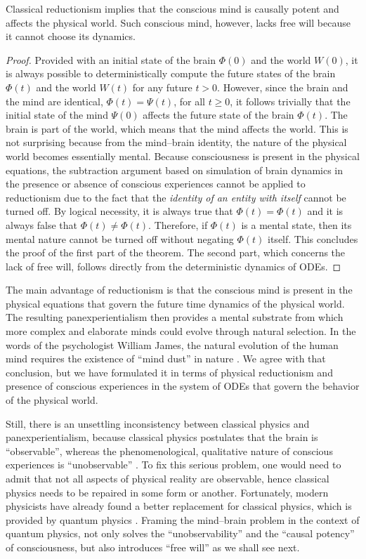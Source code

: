 \documentclass{ws-ijmpb}
\begin{document}
\begin{theorem}
\label{thm:2}
Classical reductionism implies that the conscious mind
is causally potent and affects the physical world. Such conscious
mind, however, lacks free will because it cannot choose its dynamics.
\end{theorem}
\begin{proof}
Provided with an initial state of the brain $\Phi(0)$ and the world $W(0)$, it is always
possible to deterministically compute the future states of the brain
$\Phi(t)$ and the world $W(t)$ for any future $t>0$. However, since the brain and the
mind are identical, $\Phi(t)=\Psi(t)$, for all $t\geq 0$, it follows
trivially that the initial state of the mind $\Psi(0)$ affects the
future state of the brain $\Phi(t)$. The brain is part of the world,
which means that the mind affects the world. This is not surprising
because from the mind--brain identity, the nature of the physical world becomes essentially mental.
Because consciousness is present in the physical equations,
the subtraction argument based on simulation of brain dynamics in the presence or absence of
conscious experiences cannot be applied to reductionism due to the fact that the
\emph{identity of an entity with itself} cannot be turned off.
By logical necessity, it is always true that $\Phi(t)=\Phi(t)$ and it is always
false that $\Phi(t)\neq\Phi(t)$. Therefore, if $\Phi(t)$ is a mental
state, then its mental nature cannot be turned off without negating
$\Phi(t)$ itself. This concludes the proof of the first part of the theorem.
The second part, which concerns the lack of free will, follows directly from the deterministic
dynamics of ODEs.
\end{proof}

The main advantage of reductionism is that the conscious mind is present
in the physical equations that govern the future time dynamics of
the physical world. The resulting panexperientialism then provides
a mental substrate from which more complex and elaborate minds could
evolve through natural selection. In the words of the psychologist William
James, the natural evolution of the human mind requires the existence
of ``mind dust'' in nature \cite{James1890}. We agree with
that conclusion, but we have formulated it in terms of physical reductionism
and presence of conscious experiences in the system of ODEs that govern
the behavior of the physical world.

Still, there is an unsettling inconsistency between classical
physics and panexperientialism, because classical physics postulates
that the brain is ``observable'', whereas the phenomenological,
qualitative nature of conscious experiences is ``unobservable''
\cite{Georgiev2020a,Georgiev2020b}. To fix this serious problem,
one would need to admit that not all aspects of physical reality are
observable, hence classical physics needs to be repaired in some form
or another. Fortunately, modern physicists have already found a better
replacement for classical physics, which is provided by quantum physics
\cite{Dirac1967,Susskind2014,Bhaumik2019}. Framing the mind--brain problem in
the context of quantum physics, not only solves the ``unobservability''
and the ``causal potency'' of consciousness, but also introduces
``free will'' as we shall see next.
\end{document}
